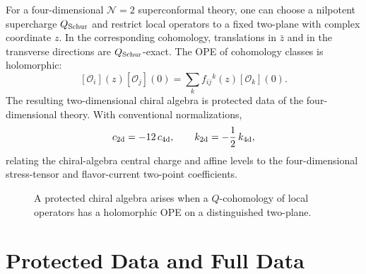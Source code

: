 For a four-dimensional \(\mathcal N=2\) superconformal theory, one can choose
a nilpotent supercharge \(Q_{\rm Schur}\) and restrict local operators to a
fixed two-plane with complex coordinate \(z\).  In the corresponding
cohomology, translations in \(\bar z\) and in the transverse directions are
\(Q_{\rm Schur}\)-exact.  The OPE of cohomology classes is holomorphic:
\[
  [\mathcal O_i](z)[\mathcal O_j](0)
  =
  \sum_k f_{ij}{}^k(z)[\mathcal O_k](0).
\]
The resulting two-dimensional chiral algebra is protected data of the
four-dimensional theory.  With conventional normalizations,
\[
  c_{\rm 2d}=-12\,c_{\rm 4d},
  \qquad
  k_{\rm 2d}=-\frac12\,k_{\rm 4d},
\]
relating the chiral-algebra central charge and affine levels to the
four-dimensional stress-tensor and flavor-current two-point coefficients.

\begin{figure}[H]
  \centering
  \caption{A protected chiral algebra arises when a \(Q\)-cohomology of local
  operators has a holomorphic OPE on a distinguished two-plane.}
  \label{fig:protected-chiral-algebra-plane}
\end{figure}

\section{Protected Data and Full Data}


